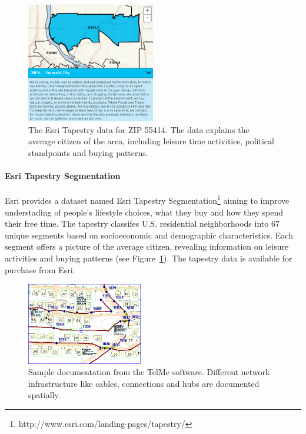 \documentclass[twocolumn]{article}
\begin{document}
\begin{figure}
  \centering
  \includegraphics[width=0.5\textwidth]{img/tapestry.png}
  \caption{The Esri Tapestry data for ZIP 55414. The data explains the average citizen of the area, including leisure time activities, political standpoints and buying patterns.}
  \label{fig:tapestry}
\end{figure}
\paragraph{Esri Tapestry Segmentation}
\label{par:Esri Tapestry Segmentation}
Esri provides a dataset named Esri Tapestry Segmentation\footnote{http://www.esri.com/landing-pages/tapestry/} aiming to improve understading of people's lifestyle choices, what they buy and how they spend their free time. The tapestry classifes U.S. residential neighborhoods into 67 unique segments based on socioeconomic and demographic characteristics. Each segment offers a picture of the average citizen, revealing information on leisure activities and buying patterns (see Figure~\ref{fig:tapestry}). The tapestry data is available for purchase from Esri.

\begin{figure}
  \centering
  \includegraphics[width=0.45\textwidth]{img/telme.png}
  \caption{Sample documentation from the TelMe software. Different network infrastructure like cables, connections and hubs are documented spatially.}
  \label{fig:telme}
\end{figure}
\end{document}
